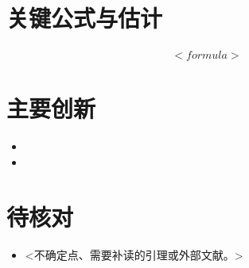 \documentclass[UTF8]{ctexart}
\begin{document}
\section{关键公式与估计}
\begin{align*}
  <formula>
\end{align*}

\section{主要创新}
\begin{itemize}[leftmargin=2em]
  \item <创新点 1>
  \item <创新点 2>
\end{itemize}

\section{待核对}
\begin{itemize}[leftmargin=2em]
  \item <不确定点、需要补读的引理或外部文献。>
\end{itemize}
\end{document}
